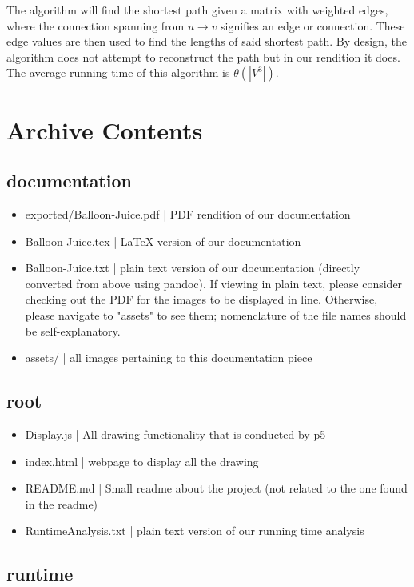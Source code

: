 \documentclass{article}
\begin{document}
The algorithm will find the shortest path given a matrix with weighted edges, where the connection spanning from $u \rightarrow v$ signifies an edge or connection.
These edge values are then used to find the lengths of said shortest path.
By design, the algorithm does not attempt to reconstruct the path but in our rendition it does.
The average running time of this algorithm is $\theta(|V^3|)$.

\newpage

\section{Archive Contents}

\subsection{documentation}
\begin{itemize}
\item exported/Balloon-Juice.pdf | PDF rendition of our documentation
\item Balloon-Juice.tex | LaTeX version of our documentation
\item Balloon-Juice.txt | plain text version of our documentation (directly converted from above using pandoc). If viewing in plain text, please consider checking out the PDF for the images to be displayed in line. Otherwise, please navigate to "assets" to see them; nomenclature of the file names should  be self-explanatory.
\item assets/\* | all images pertaining to this documentation piece
\end{itemize}

\subsection{root}

\begin{itemize}
\item Display.js | All drawing functionality that is conducted by p5
\item index.html | webpage to display all the drawing
\item README.md | Small readme about the project (not related to the one found in the readme)
\item RuntimeAnalysis.txt | plain text version of our running time analysis
\end{itemize}

\subsection{runtime}
\end{document}
